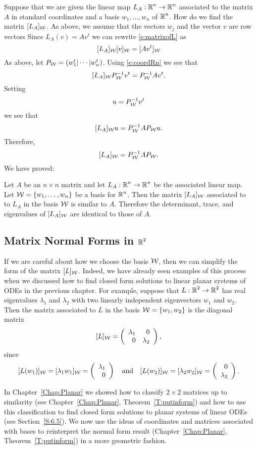 \documentclass{ximera}
\begin{document}
Suppose that we are given the linear map $L_A:\mbox{$\Bbb{R}$}^n\to\mbox{$\Bbb{R}$}^n$ associated to
the matrix $A$ in standard coordinates and a basis $w_1,\ldots,w_n$ of $\mbox{$\Bbb{R}$}^n$.
How do we find the matrix $[L_A]_{\cal W}$. As above, we assume that the
vectors $w_j$ and the vector $v$ are row vectors  Since $L_A(v)=Av^t$ we can
rewrite \eqref{e:matrixofL} as
\[
[L_A]_{\cal W}[v]_{\cal W} = [Av^t]_{\cal W}
\]
As above, let $P_{\cal W}=(w_1^t|\cdots|w_n^t)$.  Using \eqref{e:coordRn} we
see that
\[
[L_A]_{\cal W}P_{\cal W}^{-1} v^t = P_{\cal W}^{-1} Av^t.
\]
Setting
\[
u= P_{\cal W}^{-1} v^t
\]
we see that
\[
[L_A]_{\cal W}u = P_{\cal W}^{-1} A P_{\cal W}u.
\]
Therefore,
\[
[L_A]_{\cal W} = P_{\cal W}^{-1} AP_{\cal W}.
\]
We have proved:
\begin{theorem}
Let $A$ be an $n\times n$ matrix and let $L_A:\mbox{$\Bbb{R}$}^n\to\mbox{$\Bbb{R}$}^n$ be the associated
linear map.  Let ${\cal W} = \{w_1,\ldots,w_n\}$ be a basis for
$\mbox{$\Bbb{R}$}^n$.  Then the matrix $[L_A]_{\cal W}$ associated to to $L_A$ in the basis
${\cal W}$ is similar to $A$.  Therefore the determinant, trace,
and eigenvalues of $[L_A]_{\cal W}$ are identical to those of $A$.
\end{theorem}




\subsection*{Matrix Normal Forms in $\mbox{$\Bbb{R}$}^2$} 

If we are careful about how we choose the basis ${\cal W}$, then
we can simplify the form of the matrix $[L]_{\cal W}$.  Indeed, we
have already seen examples of this process when we discussed how
to find closed form solutions to linear planar systems of ODEs in
the previous chapter.  For example, suppose that $L:\mbox{$\Bbb{R}$}^2\to\mbox{$\Bbb{R}$}^2$
has real eigenvalues $\lambda_1$ and $\lambda_2$ with two
linearly independent eigenvectors $w_1$ and $w_2$.  Then the
matrix associated to $L$ in the basis ${\cal W} = \{w_1,w_2\}$
is the diagonal matrix
\begin{equation}   \label{e:diagcoord}
[L]_{\cal W} = \left(\begin{array}{rr} \lambda_1 & 0\\ 0 &\lambda_2\end{array}\right),
\end{equation}
since
\[
[L(w_1)]_{\cal W} = [\lambda_1w_1]_{\cal W} = \left(\begin{array}{r} \lambda_1 \\ 0\end{array}\right) \quad\mbox{and}\quad
[L(w_2)]_{\cal W} = [\lambda_2w_2]_{\cal W} = \left(\begin{array}{r} 0 \\ \lambda_2\end{array}\right).
\]

In Chapter~\ref{Chap:Planar} we showed how to classify $2\times 2$
matrices up to similarity (see Chapter~\ref{Chap:Planar},
Theorem~\ref{T:putinform}) and how to use this classification to find
closed form solutions to planar systems of linear ODEs (see
Section~\ref{S:6.5}).  We now use
the ideas of coordinates and matrices associated with bases to
reinterpret the normal form result (Chapter~\ref{Chap:Planar},
Theorem~\ref{T:putinform}) in a more geometric fashion.
\end{document}
